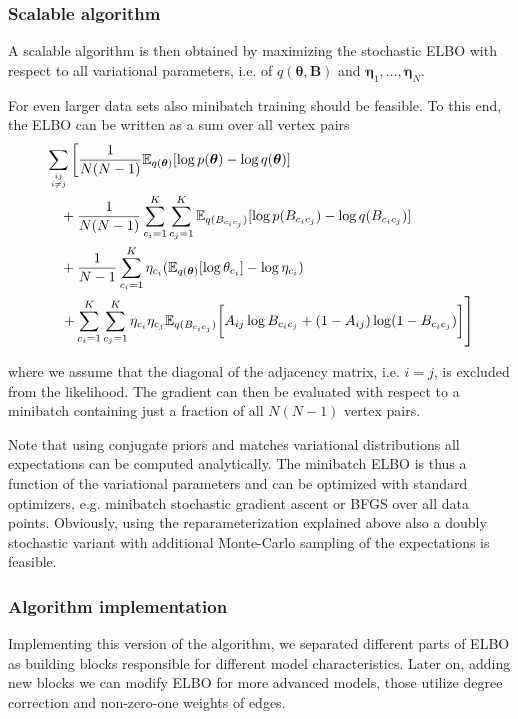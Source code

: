 \documentclass{article}
\renewcommand{\v}[1]{\bm{#1}}
\newcommand{\E}{\mathbb{E}}
\begin{document}
\subsubsection{Scalable algorithm}

A scalable algorithm is then obtained by maximizing the stochastic
ELBO with respect to all variational parameters, i.e. of
$q(\v{\theta}, \v{B})$ and $\v{\eta}_1, \ldots, \v{\eta}_N$. 

For even larger data sets also minibatch training should be feasible.
To this end, the ELBO can be written as a sum over all vertex pairs
\begin{equation}
\begin{split}
& \sum_{ij \atop i \neq j} \left[ \frac{1}{N (N - 1)} \E_{q(\v{\theta})}[\log p(\v{\theta}) - \log q(\v{\theta})] \right. \\
&  \quad + \frac{1}{N (N - 1)} \sum_{c_i=1}^K \sum_{c_j=1}^K  \E_{q(B_{c_ic_j})}[\log p(B_{c_ic_j}) - \log q(B_{c_ic_j})] \\
&  \quad + \frac{1}{N - 1} \sum_{c_i=1}^K \eta_{c_i} (\E_{q(\v{\theta})}[\log \theta_{c_i}] - \log \eta_{c_i}) \\
&  \quad \left.
+ \sum_{c_i=1}^K \sum_{c_j=1}^K \eta_{c_i} \eta_{c_j}
\E_{q(B_{c_ic_j})}\biggl[ A_{ij} \log B_{c_ic_j} + (1 - A_{ij}) \log (1 - B_{c_ic_j}) \biggr]
\right]
\end{split}
\end{equation}

where we assume that the diagonal of the adjacency matrix, i.e.
$i = j$, is excluded from the likelihood. The gradient can then be
evaluated with respect to a minibatch containing just a fraction of
all $N (N - 1)$ vertex pairs.

Note that using conjugate priors and matches variational distributions
all expectations can be computed analytically. The minibatch ELBO is
thus a function of the variational parameters and can be optimized
with standard optimizers, e.g. minibatch stochastic gradient ascent or
BFGS over all data points. Obviously, using the reparameterization
explained above also a doubly stochastic variant with additional
Monte-Carlo sampling of the expectations is feasible.

\subsubsection{Algorithm implementation}

Implementing this version of the algorithm, we separated different parts of ELBO as building blocks responsible for different model characteristics. Later on, adding new blocks we can modify ELBO for more advanced models, those utilize degree correction and non-zero-one weights of edges.\\
\end{document}
